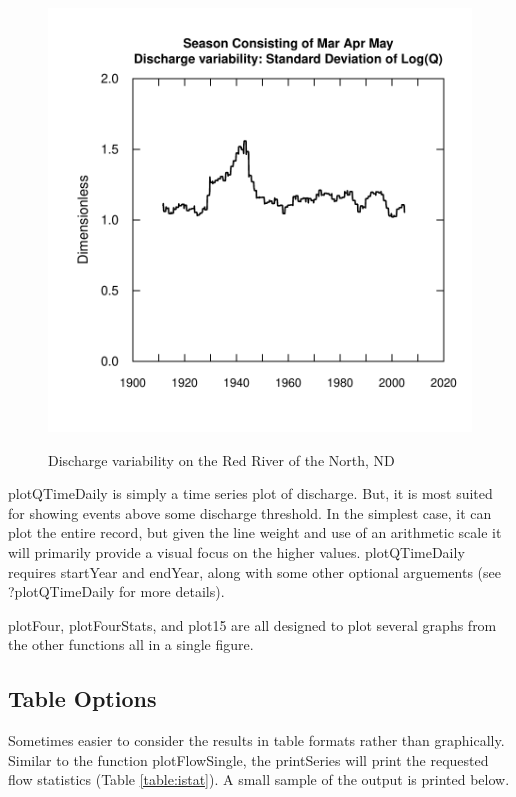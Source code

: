 \documentclass[a4paper,11pt]{article}
\begin{document}
\begin{figure}[htbp]
\begin{minipage}[h]{0.5\linewidth}
\begin{center}
\includegraphics{EGRET-fig3b}
    \label{fig:SDRed2}
    \end{center}
  \end{minipage}
  \caption{Discharge variability on the Red River of the North, ND}
  \label{fig:red}
\end{figure}

plotQTimeDaily is simply a time series plot of discharge.  But, it is most suited for showing events above some discharge threshold.  In the simplest case, it can plot the entire record, but given the line weight and use of an arithmetic scale it will primarily provide a visual focus on the higher values. plotQTimeDaily requires startYear and endYear, along with some other optional arguements (see ?plotQTimeDaily for more details).

plotFour, plotFourStats, and plot15 are all designed to plot several graphs from the other functions all in a single figure. 

\FloatBarrier
\subsection{Table Options}
\label{sec:tableOptions}
Sometimes easier to consider the results in table formats rather than graphically. Similar to the function plotFlowSingle, the printSeries will print the requested flow statistics (Table \ref{table:istat}). A small sample of the output is printed below.
\end{document}
